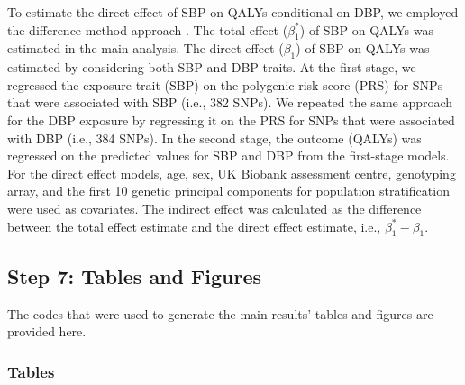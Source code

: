 \documentclass[11pt]{article}
\newcounter{subsubsubsection}[subsubsection]
\begin{document}
To estimate the direct effect of SBP on QALYs conditional on DBP, we employed the difference method approach \cite{sanderson2021multivariable}. The total effect ($\beta_1^*$) of SBP on QALYs was estimated in the main analysis. The direct effect ($\beta_1$) of SBP on QALYs was estimated by considering both SBP and DBP traits. At the first stage, we regressed the exposure trait (SBP) on the polygenic risk score (PRS) for SNPs that were associated with SBP (i.e., 382 SNPs). We repeated the same approach for the DBP exposure by regressing it on the PRS for SNPs that were associated with DBP (i.e., 384 SNPs). In the second stage, the outcome (QALYs) was regressed on the predicted values for SBP and DBP from the first-stage models. For the direct effect models, age, sex, UK Biobank assessment centre, genotyping array, and the first 10 genetic principal components for population stratification were used as covariates. The indirect effect was calculated as the difference between the total effect estimate and the direct effect estimate, i.e., $\beta_1^* - \beta_1$.
\color{violet}
\begin{stlog}\end{stlog}
\color{black}
\newpage
\subsection{Step 7: Tables and Figures}

The codes that were used to generate the main results' tables and figures are provided here.

\subsubsection{Tables}

\color{violet}
\begin{stlog}\end{stlog}
\color{black}
\newpage
{}
\color{violet}
\begin{stlog}\end{stlog}
\color{black}
\newpage
{}
\color{violet}
\begin{stlog}\end{stlog}
\color{black}
\newpage
{}
\color{violet}
\begin{stlog}\end{stlog}
\color{black}
\newpage
{}
\color{violet}
\begin{stlog}\end{stlog}
\color{black}
\newpage
{}
\color{violet}
\begin{stlog}\end{stlog}
\color{black}
\newpage
\end{document}

